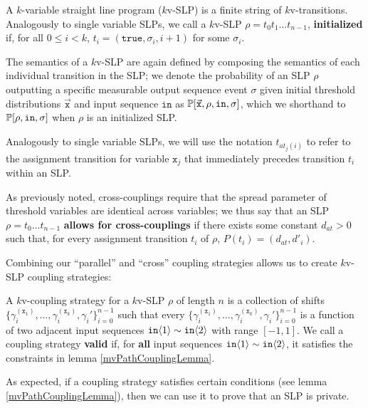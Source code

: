 \begin{defn}
    A $k$-variable straight line program ($k$v-SLP) is a finite string of $k$v-transitions. Analogously to single variable SLPs, we call a $k$v-SLP $\rho = t_0t_1\ldots t_{n-1}$, \textbf{initialized} if, for all $0\leq i < k$, $t_i = (\texttt{true}, \sigma_i, i+1)$ for some $\sigma_i$.
\end{defn}

The semantics of a $k$v-SLP are again defined by composing the semantics of each individual transition in the SLP; we denote the probability of an SLP $\rho$ outputting a specific measurable output sequence event $\sigma$ given initial threshold distributions $\vec{\texttt{x}}$ and input sequence $\texttt{in}$ as $\mathbb{P}[\vec{\texttt{x}}, \rho, \texttt{in}, \sigma]$, which we shorthand to $\mathbb{P}[\rho, \texttt{in}, \sigma]$ when $\rho$ is an initialized SLP.

Analogously to single variable SLPs, we will use the notation $t_{at_j(i)}$ to refer to the assignment transition for variable $\texttt{x}_j$ that immediately precedes transition $t_i$ within an SLP. 

As previously noted, cross-couplings require that the spread parameter of threshold variables are identical across variables; we thus say that an SLP $\rho = t_0\ldots t_{n-1}$ \textbf{allows for cross-couplings} if there exists some constant $d_{at}>0$ such that, for every assignment transition $t_i$ of $\rho$, $P(t_i) = (d_{at}, d'_i)$. 


Combining our ``parallel'' and ``cross'' coupling strategies allows us to create $k$v-SLP coupling strategies:

\begin{defn}
    A $k$v-coupling strategy for a $k$v-SLP $\rho$ of length $n$ is a collection of shifts $\{\gamma_i^{(\texttt{x}_1)},\ldots, \gamma_i^{(\texttt{x}_k)}, \gamma_i'\}_{i=0}^{n-1}$ such that every $\{\gamma_i^{(\texttt{x}_1)},\ldots, \gamma_i^{(\texttt{x}_k)}, \gamma_i'\}_{i=0}^{n-1}$ is a function of two adjacent input sequences $\texttt{in}\langle1 \rangle\sim \texttt{in}\langle2 \rangle$ with range $[-1, 1]$. 
    We call a coupling strategy \textbf{valid} if, for \textbf{all} input sequences $\texttt{in}\langle1 \rangle\sim\texttt{in}\langle2 \rangle$, it satisfies the constraints in lemma \ref{mvPathCouplingLemma}.
\end{defn}

As expected, if a coupling strategy satisfies certain conditions (see lemma \ref{mvPathCouplingLemma}), then we can use it to prove that an SLP is private. 

